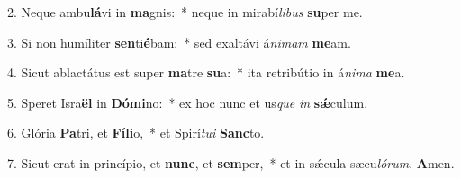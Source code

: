 2. Neque ambu\textbf{lá}vi in \textbf{ma}gnis:~*  neque in mirabí\textit{li}\textit{bus} \textbf{su}per me.\

3. Si non humíliter \textbf{sen}ti\textbf{é}bam:~*  sed exaltávi á\textit{ni}\textit{mam} \textbf{me}am.\

4. Sicut ablactátus est super \textbf{ma}tre \textbf{su}a:~*  ita retribútio in á\textit{ni}\textit{ma} \textbf{me}a.\

5. Speret Isra\textbf{ël} in \textbf{Dó}\textbf{mi}no:~*  ex hoc nunc et us\textit{que} \textit{in} \textbf{sǽ}culum.\

6. Glória \textbf{Pa}tri, et \textbf{Fí}\textbf{li}o,~*  et Spirí\textit{tu}\textit{i} \textbf{Sanc}to.\

7. Sicut erat in princípio, et \textbf{nunc}, et \textbf{sem}per,~*  et in sǽcula sæcu\textit{ló}\textit{rum}. \textbf{A}men.\

